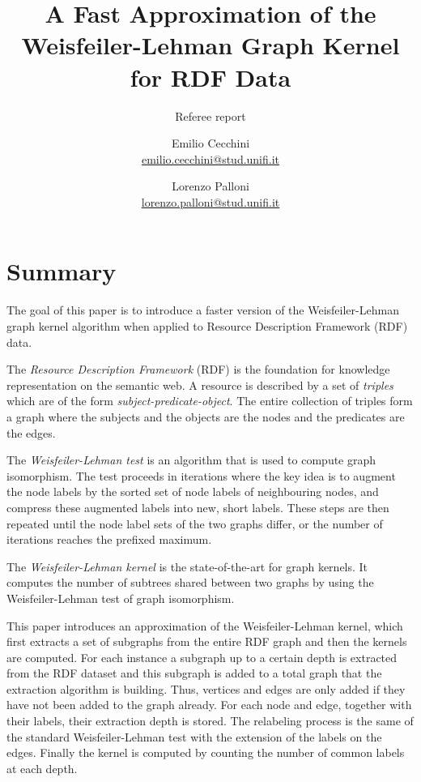 \documentclass[12pt]{scrartcl}
\begin{document}
\title{A Fast Approximation of the Weisfeiler-Lehman Graph Kernel for RDF Data}
\subtitle{Referee report}
\author{
Emilio Cecchini \\ \href{mailto:emilio.cecchini@stud.unifi.it}{emilio.cecchini@stud.unifi.it}
\and
Lorenzo Palloni \\ \href{mailto:lorenzo.palloni@stud.unifi.it}{lorenzo.palloni@stud.unifi.it}
}

\maketitle

\section{Summary}

The goal of this paper is to introduce a faster version of the Weisfeiler-Lehman graph kernel algorithm when applied to Resource Description Framework (RDF) data.

The \textit{Resource Description Framework} (RDF) is the foundation for knowledge representation on the semantic web. A resource is described by a set of \textit{triples} which are of the form \textit{subject-predicate-object}. The entire collection of triples form a graph where the subjects and the objects are the nodes and the predicates are the edges.

The \textit{Weisfeiler-Lehman test} is an algorithm that is used to compute graph isomorphism. The test proceeds in iterations where the key idea is to augment the node labels by the sorted set of node labels of neighbouring nodes, and compress these augmented labels into new, short labels. These steps are then repeated until the node label sets of the two graphs differ, or the number of iterations reaches the prefixed maximum.

The \textit{Weisfeiler-Lehman kernel} is the state-of-the-art for graph kernels. It computes the number of subtrees shared between two graphs by using the Weisfeiler-Lehman test of graph isomorphism.

This paper introduces an approximation of the Weisfeiler-Lehman kernel, which first extracts a set of subgraphs from the entire RDF graph and then the kernels are computed. For each instance a subgraph up to a certain depth is extracted from the RDF dataset and this subgraph is added to a total graph that the extraction algorithm is building. Thus, vertices and edges are only added if they have not been added to the graph already. For each node and edge, together with their labels, their extraction depth is stored. The relabeling process is the same of the standard Weisfeiler-Lehman test with the extension of the labels on the edges. Finally the kernel is computed by counting the number of common labels at each depth.
\end{document}
